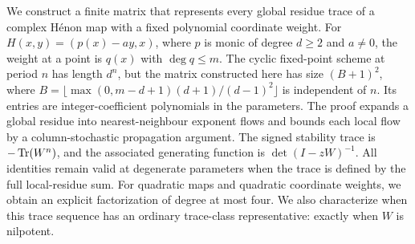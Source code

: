 We construct a finite matrix that represents every global residue trace of a
complex H\'enon map with a fixed polynomial coordinate weight. For
$H(x,y)=(p(x)-ay,x)$, where $p$ is monic of degree $d\ge2$ and $a\ne0$,
the weight at a point is $q(x)$ with $\deg q\le m$.
The cyclic fixed-point scheme at period $n$ has length $d^n$, but the matrix
constructed here has size $(B+1)^2$, where
$B=\lfloor\max(0,m-d+1)(d+1)/(d-1)^2\rfloor$ is independent of $n$.
Its entries are integer-coefficient polynomials in the parameters.
The proof expands a global residue into nearest-neighbour exponent flows
and bounds each local flow by a column-stochastic propagation argument.
The signed stability trace is $-\operatorname{Tr}(W^n)$, and the associated generating
function is $\det(I-zW)^{-1}$.
All identities remain valid at degenerate parameters when the trace is
defined by the full local-residue sum. For quadratic maps and quadratic
coordinate weights, we obtain an explicit factorization of degree at most
four. We also characterize when this trace sequence has an ordinary
trace-class representative: exactly when $W$ is nilpotent.

